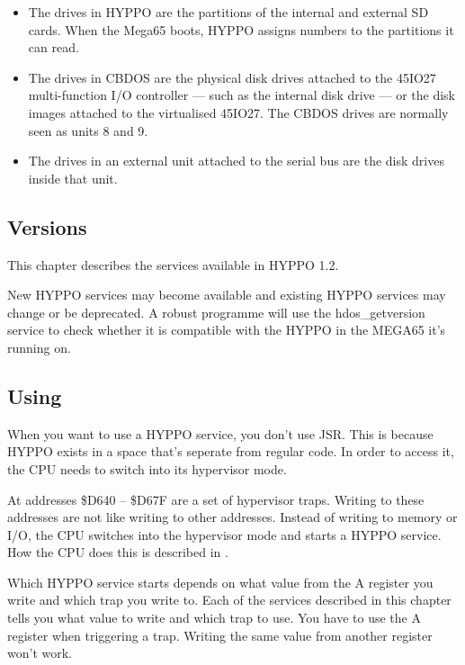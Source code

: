 \begin{itemize}
  \item The drives in HYPPO are the partitions of the internal and external SD
        cards. When the Mega65 boots, HYPPO assigns numbers to the partitions
        it can read.
  \item The drives in CBDOS are the physical disk drives attached to the 45IO27
        multi-function I/O controller --- such as the internal disk drive ---
        or the disk images attached to the virtualised 45IO27. The CBDOS drives
        are normally seen as units 8 and 9.
  \item The drives in an external unit attached to the serial bus are the
        disk drives inside that unit.
\end{itemize}

\subsection{Versions}

This chapter describes the services available in HYPPO 1.2.

New HYPPO services may become available and existing HYPPO services may change
or be deprecated. A robust programme will use the hdos\_getversion service to
check whether it is compatible with the HYPPO in the MEGA65 it's running on.


\subsection{Using}
When you want to use a HYPPO service, you don't use JSR. This is because
HYPPO exists in a space that's seperate from regular code. In order to
access it, the CPU needs to switch into its hypervisor mode.

At addresses \$D640 -- \$D67F are a set of hypervisor traps. Writing to these
addresses are not like writing to other addresses. Instead of writing to memory
or I/O, the CPU switches into the hypervisor mode and starts a HYPPO service.
How the CPU does this is described in .

Which HYPPO service starts depends on what value from the A register you
write and which trap you write to. Each of the services described in this
chapter tells you what value to write and which trap to use. You have to use the
A register when triggering a trap. Writing the same value from another register
won't work.

